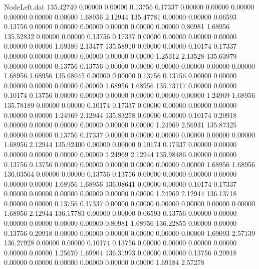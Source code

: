 \begin{filecontents}{NodeLeft.dat}
 135.42740    0.00000    0.00000     0.13756    0.17337    0.00000    0.00000    0.00000    0.00000    0.00000    0.00000    1.68956    2.12944
 135.47781    0.00000    0.00000     0.06593    0.13756    0.00000    0.00000    0.00000    0.00000    0.00000    0.00000    0.80981    1.68956
 135.52832    0.00000    0.00000     0.13756    0.17337    0.00000    0.00000    0.00000    0.00000    0.00000    0.00000    1.69380    2.13477
 135.58910    0.00000    0.00000     0.10174    0.17337    0.00000    0.00000    0.00000    0.00000    0.00000    0.00000    1.25312    2.13528
 135.63979    0.00000    0.00000     0.13756    0.13756    0.00000    0.00000    0.00000    0.00000    0.00000    0.00000    1.68956    1.68956
 135.68045    0.00000    0.00000     0.13756    0.13756    0.00000    0.00000    0.00000    0.00000    0.00000    0.00000    1.68956    1.68956
 135.73117    0.00000    0.00000     0.10174    0.13756    0.00000    0.00000    0.00000    0.00000    0.00000    0.00000    1.24969    1.68956
 135.78189    0.00000    0.00000     0.10174    0.17337    0.00000    0.00000    0.00000    0.00000    0.00000    0.00000    1.24969    2.12944
 135.83258    0.00000    0.00000     0.10174    0.20918    0.00000    0.00000    0.00000    0.00000    0.00000    0.00000    1.24969    2.56931
 135.87325    0.00000    0.00000     0.13756    0.17337    0.00000    0.00000    0.00000    0.00000    0.00000    0.00000    1.68956    2.12944
 135.92400    0.00000    0.00000     0.10174    0.17337    0.00000    0.00000    0.00000    0.00000    0.00000    0.00000    1.24969    2.12944
 135.98486    0.00000    0.00000     0.13756    0.13756    0.00000    0.00000    0.00000    0.00000    0.00000    0.00000    1.68956    1.68956
 136.03564    0.00000    0.00000     0.13756    0.13756    0.00000    0.00000    0.00000    0.00000    0.00000    0.00000    1.68956    1.68956
 136.08641    0.00000    0.00000     0.10174    0.17337    0.00000    0.00000    0.00000    0.00000    0.00000    0.00000    1.24969    2.12944
 136.13718    0.00000    0.00000     0.13756    0.17337    0.00000    0.00000    0.00000    0.00000    0.00000    0.00000    1.68956    2.12944
 136.17783    0.00000    0.00000     0.06593    0.13756    0.00000    0.00000    0.00000    0.00000    0.00000    0.00000    0.80981    1.68956
 136.22855    0.00000    0.00000     0.13756    0.20918    0.00000    0.00000    0.00000    0.00000    0.00000    0.00000    1.69093    2.57139
 136.27928    0.00000    0.00000     0.10174    0.13756    0.00000    0.00000    0.00000    0.00000    0.00000    0.00000    1.25670    1.69904
 136.31993    0.00000    0.00000     0.13756    0.20918    0.00000    0.00000    0.00000    0.00000    0.00000    0.00000    1.69184    2.57278

\end{filecontents}
